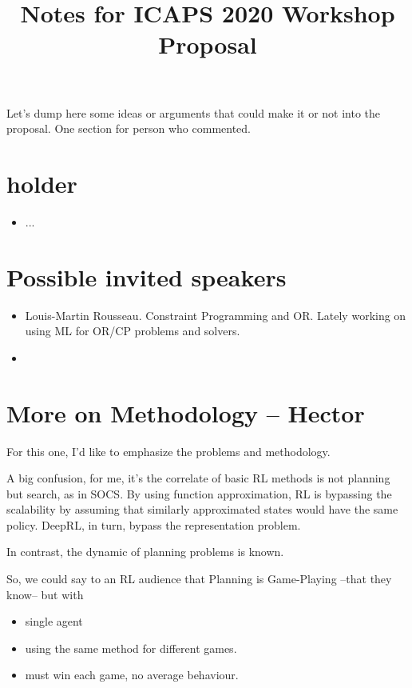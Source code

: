 \documentclass[10pt]{article}
\begin{document}
\title{Notes for ICAPS 2020 Workshop Proposal}
\date{}

\author{}

\maketitle

Let's dump here some ideas or arguments that could make it or not into the proposal.
One section for person who commented.

\section*{holder}

\begin{itemize}
\item ...
\end{itemize}

\section*{Possible invited speakers}

\begin{itemize}
\item Louis-Martin Rousseau. Constraint Programming and OR. Lately working on using ML for OR/CP problems and solvers.
\item 
\end{itemize}

\section*{More on Methodology – Hector}

For this one, I'd like to emphasize the problems and methodology.

A big confusion, for me, it's the correlate of basic RL methods is not planning but search, as in SOCS.
By using function approximation, RL is bypassing the scalability
by assuming that similarly approximated states would have the same policy.
DeepRL, in turn, bypass the representation problem.

In contrast, the dynamic of planning problems is known.

So, we could say to an RL audience that Planning is Game-Playing –that they know– but with
\begin{itemize}
\item single agent
\item using the same method for different games.
\item must win each game, no average behaviour. 
\end{itemize}
\end{document}
